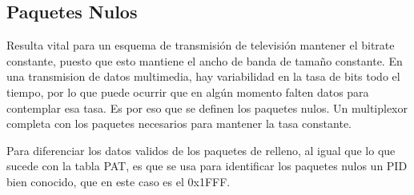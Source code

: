 	
	\subsection{Paquetes Nulos}
	
	Resulta vital para un esquema de transmisión de televisión mantener el bitrate constante, puesto que esto mantiene el ancho de banda de tamaño constante. En una transmision de datos multimedia, hay variabilidad en la tasa de bits todo el tiempo, por lo que puede ocurrir que en algún momento falten datos para contemplar esa tasa. Es por eso que se definen los paquetes nulos. Un multiplexor completa con los paquetes necesarios para mantener la tasa constante.
	
	Para diferenciar los datos validos de los paquetes de relleno, al igual que lo que sucede con la tabla PAT, es que se usa para identificar los paquetes nulos un PID bien conocido, que en este caso es el 0x1FFF.

